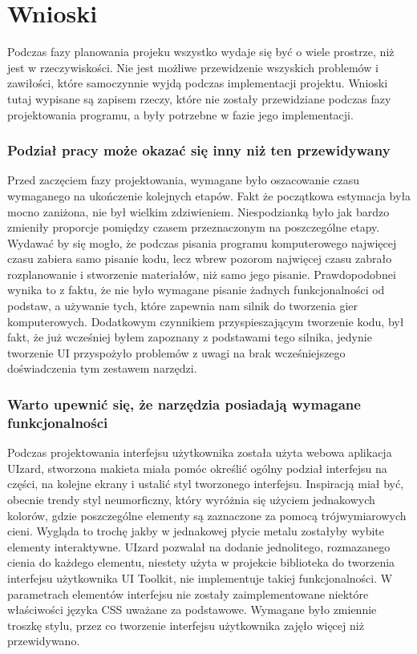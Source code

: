 \documentclass{article} %
\begin{document}
\newpage
\section{Wnioski}
    Podczas fazy planowania projeku wszystko wydaje się być o wiele prostrze, niż jest w rzeczywiskości. Nie jest możliwe przewidzenie wszyskich problemów i zawiłości, które samoczynnie wyjdą podczas implementacji projektu. Wnioski tutaj wypisane są zapisem rzeczy, które nie zostały przewidziane podczas fazy projektowania programu, a były potrzebne w fazie jego implementacji.
    \\
    
    \subsubsection*{Podział pracy może okazać się inny niż ten przewidywany}
        Przed zaczęciem fazy projektowania, wymagane było oszacowanie czasu wymaganego na ukończenie kolejnych etapów. Fakt że początkowa estymacja była mocno zaniżona, nie był wielkim zdziwieniem. Niespodzianką było jak bardzo zmieniły proporcje pomiędzy czasem przeznaczonym na poszczególne etapy. Wydawać by się mogło, że podczas pisania programu komputerowego najwięcej czasu zabiera samo pisanie kodu, lecz wbrew pozorom najwięcej czasu zabrało rozplanowanie i stworzenie materiałów, niż samo jego pisanie. Prawdopodobnei wynika to z faktu, że nie było wymagane pisanie żadnych funkcjonalności od podstaw, a używanie tych, które zapewnia nam silnik do tworzenia gier komputerowych. Dodatkowym czynnikiem przyspieszającym tworzenie kodu, był fakt, że już wcześniej byłem zapoznany z podstawami tego silnika, jedynie tworzenie UI przyspożyło problemów z uwagi na brak wcześniejszego doświadczenia tym zestawem narzędzi.
        \\
        
    \subsubsection*{Warto upewnić się, że narzędzia posiadają wymagane funkcjonalności}
        Podczas projektowania interfejsu użytkownika została użyta webowa aplikacja UIzard, stworzona makieta miała pomóc określić ogólny podział interfejsu na części, na kolejne ekrany i ustalić styl tworzonego interfejsu. Inspiracją miał być, obecnie trendy styl neumorficzny, który wyróżnia się użyciem jednakowych kolorów, gdzie poszczególne elementy są zaznaczone za pomocą trójwymiarowych cieni. Wygląda to trochę jakby w jednakowej płycie metalu zostałyby wybite elementy interaktywne. UIzard pozwalał na dodanie jednolitego, rozmazanego cienia do każdego elementu, niestety użyta w projekcie biblioteka do tworzenia interfejsu użytkownika UI Toolkit, nie implementuje takiej funkcjonalności. W parametrach elementów interfejsu nie zostały zaimplementowane niektóre właściwości języka CSS uważane za podstawowe. Wymagane było zmiennie troszkę stylu, przez co tworzenie interfejsu użytkownika zajęło więcej niż przewidywano.
        \\
        
\end{document}
